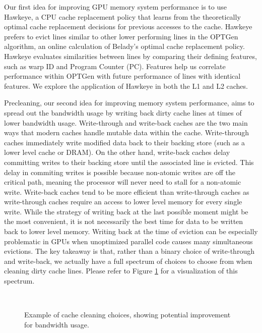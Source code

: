 Our first idea for improving GPU memory system performance is to use Hawkeye, a CPU cache replacement policy that learns from the theoretically optimal cache replacement decisions for previous accesses to the cache. Hawkeye prefers to evict lines similar to other lower performing lines in the OPTGen algorithm, an online calculation of Belady’s optimal cache replacement policy. Hawkeye evaluates similarities between lines by comparing their defining features, such as warp ID and Program Counter (PC). Features help us correlate performance within OPTGen with future performance of lines with identical features. We explore the application of Hawkeye in both the L1 and L2 caches.

Precleaning, our second idea for improving memory system performance, aims to spread out the bandwidth usage by writing back dirty cache lines at times of lower bandwidth usage. Write-through and write-back caches are the two main ways that modern caches handle mutable data within the cache. Write-through caches immediately write modified data back to their backing store (such as a lower level cache or DRAM). On the other hand, write-back caches delay committing writes to their backing store until the associated line is evicted. This delay in commiting writes is possible because non-atomic writes are off the critical path, meaning the processor will never need to stall for a non-atomic write. Write-back caches tend to be more efficient than write-through caches as write-through caches require an access to lower level memory for every single write. While the strategy of writing back at the last possible moment might be the most convenient, it is not necessarily the best time for data to be written back to lower level memory. Writing back at the time of eviction can be especially problematic in GPUs when unoptimized parallel code causes many simultaneous evictions. The key takeaway is that, rather than a binary choice of write-through and write-back, we actually have a full spectrum of choices to choose from when cleaning dirty cache lines. Please refer to Figure \ref{f:bandwidth_optimal} for a visualization of this spectrum.

\begin{figure}[htb]
\begin{center}
\ 
\caption{Example of cache cleaning choices, showing potential improvement for bandwidth usage.}
\label{f:bandwidth_optimal}
\end{center}
\end{figure}
%

